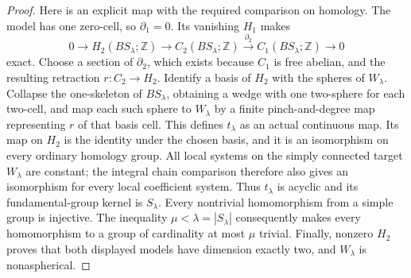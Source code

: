 \begin{proof}
Here is an explicit map with the required comparison on homology.
The model has one zero-cell, so $\partial_1=0$. Its vanishing
$H_1$ makes
\[
 0\longrightarrow H_2(BS_\lambda;\mathbb Z)
 \longrightarrow C_2(BS_\lambda;\mathbb Z)
 \xrightarrow{\partial_2} C_1(BS_\lambda;\mathbb Z)
 \longrightarrow0
\]
exact. Choose a section of $\partial_2$, which exists because
$C_1$ is free abelian, and the resulting retraction
$r:C_2\to H_2$. Identify a basis of $H_2$ with the spheres of
$W_\lambda$. Collapse the one-skeleton of $BS_\lambda$, obtaining
a wedge with one two-sphere for each two-cell, and map each such
sphere to $W_\lambda$ by a finite pinch-and-degree map representing
$r$ of that basis cell. This defines $t_\lambda$ as an actual
continuous map. Its map on $H_2$ is the identity under the chosen
basis, and it is an isomorphism on every ordinary homology group.
All local systems on the simply connected target $W_\lambda$
are constant; the integral chain comparison therefore also gives
an isomorphism for every local coefficient system. Thus
$t_\lambda$ is acyclic and its fundamental-group kernel is
$S_\lambda$. Every nontrivial homomorphism from a simple group is
injective. The inequality $\mu<\lambda=|S_\lambda|$ consequently
makes every homomorphism to a group of cardinality at most $\mu$
trivial. Finally, nonzero $H_2$ proves that both displayed models
have dimension exactly two, and $W_\lambda$ is nonaspherical.
\end{proof}

